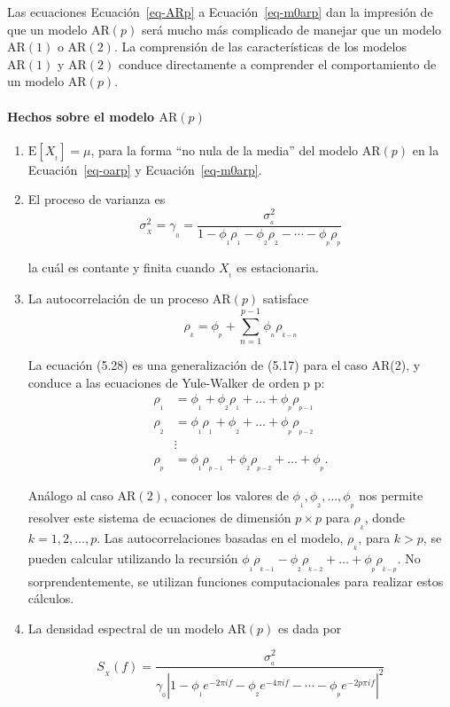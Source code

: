 \documentclass[
  us-letterpaper,
]{scrreprt}
\let\oldparagraph\paragraph
\renewcommand{\paragraph}[1]{\oldparagraph{#1}\mbox{}}
\theoremstyle{definition}
\theoremstyle{plain}
\theoremstyle{plain}
\theoremstyle{definition}
\theoremstyle{remark}
\begin{document}
Las ecuaciones Ecuación~\ref{eq-ARp} a Ecuación~\ref{eq-m0arp} dan la
impresión de que un modelo \(\mathrm{AR}(p)\) será mucho más complicado
de manejar que un modelo \(\mathrm{AR}(1)\) o \(\mathrm{AR}(2)\). La
comprensión de las características de los modelos \(\mathrm{AR}(1)\) y
\(\mathrm{AR}(2)\) conduce directamente a comprender el comportamiento
de un modelo \(\mathrm{AR}(p)\).

\paragraph{\texorpdfstring{Hechos sobre el modelo
\(\mathrm{AR}(p)\)}{Hechos sobre el modelo \textbackslash mathrm\{AR\}(p)}}\label{hechos-sobre-el-modelo-mathrmarp}

\begin{enumerate}
\def\labelenumi{\roman{enumi}.}
\item
  \(\mathrm{E}[X_{_t}]=\mu\), para la forma ``no nula de la media'' del
  modelo \(\mathrm{AR}(p)\) en la Ecuación~\ref{eq-oarp} y
  Ecuación~\ref{eq-m0arp}.
\item
  El proceso de varianza es
  \[\sigma_{_X}^2=\gamma_{_0}=\frac{\sigma_{_a}^2}{1-\phi_{_1}\rho_{_1}-\phi_{_2}\rho_{_2}-\cdots-\phi_{_p}\rho_{_p}}\]

  la cuál es contante y finita cuando \(X_{_t}\) es estacionaria.
\item
  La autocorrelación de un proceso \(\mathrm{AR}(p)\) satisface \[
  \rho_{_k}=\phi_{_p}+\sum_{n=1}^{p-1}\phi_{_n}\rho_{_{k-n}}
  \]

  La ecuación (5.28) es una generalización de (5.17) para el caso AR(2),
  y conduce a las ecuaciones de Yule-Walker de orden p p: \[
      \begin{split}
  \rho_{_{1}} &= \phi_{_1}+\phi_{_{2}} \rho_{_1} +\ldots + \phi_{_p} \rho_{_{p-1}} \\
  \rho_{_{2}} &= \phi_{_1}\rho_{_1}+\phi_{_{2}}  +\ldots + \phi_{_p} \rho_{_{p-2}}\\
  &\vdots \\
  \rho_{_{p}} &= \phi_{_1}\rho_{_{p-1}}+\phi_{_{2}} \rho_{_{p-2}} +\ldots + \phi_{_p}.
  \end{split}
    \]

  Análogo al caso \(\mathrm{AR}(2)\), conocer los valores de
  \(\phi_{_1}, \phi_{_2}, \ldots, \phi_{_p}\) nos permite resolver este
  sistema de ecuaciones de dimensión \(p\times p\) para \(\rho_{_k}\),
  donde \(k = 1, 2, \ldots, p\). Las autocorrelaciones basadas en el
  modelo, \(\rho_{_k}\), para \(k > p\), se pueden calcular utilizando
  la recursión
  \(\phi_{_1} \rho_{_{k-1}} - \phi_{_2} \rho_{_{k-2}} + \ldots + \phi_{_p} \rho_{_{k-p}}\).
  No sorprendentemente, se utilizan funciones computacionales para
  realizar estos cálculos.
\item
  La densidad espectral de un modelo \(\mathrm{AR}(p)\) es dada por

  \[
  S_{_X}(f)=\frac{\sigma_{_a}^2}{\gamma_{_0}|1-\phi_{_1}e^{-2\pi i f}-\phi_{_2}e^{-4\pi i f}-\cdots-\phi_{_p}e^{-2p\pi i f}|^2}
  \]
\end{enumerate}
\end{document}
